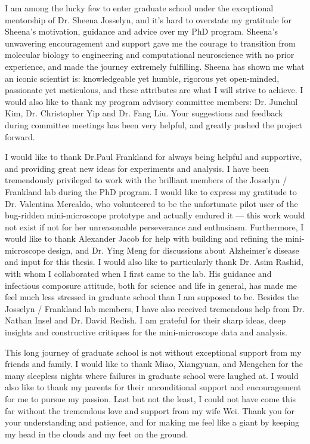 I am among the lucky few to enter graduate school under the exceptional mentorship of Dr. Sheena Josselyn, and it's hard to overstate my gratitude for Sheena's motivation, guidance and advice over my PhD program. Sheena's unwavering encouragement and support gave me the courage to transition from molecular biology to engineering and computational neuroscience with no prior experience, and made the journey extremely fulfilling. Sheena has shown me what an iconic scientist is: knowledgeable yet humble, rigorous yet open-minded, passionate yet meticulous, and these attributes are what I will strive to achieve. I would also like to thank my program advisory committee members: Dr. Junchul Kim, Dr. Christopher Yip and Dr. Fang Liu. Your suggestions and feedback during committee meetings has been very helpful, and greatly pushed the project forward. 

I would like to thank Dr.Paul Frankland for always being helpful and supportive, and providing great new ideas for experiments and analysis. I have been tremendously privileged to work with the brilliant members of the Josselyn \slash{} Frankland lab during the PhD program. I would like to express my gratitude to Dr. Valentina Mercaldo, who volunteered to be the unfortunate pilot user of the bug-ridden mini-microscope prototype and actually endured it --- this work would not exist if not for her unreasonable perseverance and enthusiasm. Furthermore, I would like to thank Alexander Jacob for help with building and refining the mini-microscope design, and Dr. Ying Meng for discussions about Alzheimer's disease and input for this thesis. I would also like to particularly thank Dr. Asim Rashid, with whom I collaborated when I first came to the lab. His guidance and infectious composure  attitude, both for science and life in general, has made me feel much less stressed in graduate school than I am supposed to be. Besides the Josselyn \slash{} Frankland lab members, I have also received tremendous help from Dr. Nathan Insel and Dr. David Redish. I am grateful for their sharp ideas, deep insights and constructive critiques for the mini-microscope data and analysis. 

This long journey of graduate school is not without exceptional support from my friends and family.  I would like to thank Miao, Xiangyuan, and Mengchen for the many sleepless nights where failures in graduate school were laughed at. I would also like to thank my parents for their unconditional support and encouragement for me to pursue my passion. Last but not the least, I could not have come this far without the tremendous love and support from my wife Wei. Thank you for your understanding and patience, and for making me feel like a giant by keeping my head in the clouds and my feet on the ground. 



